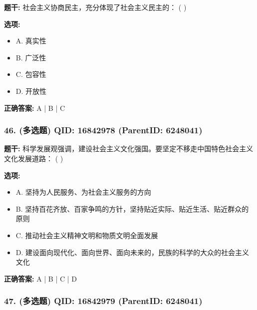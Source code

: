 \documentclass[12pt,UTF8]{ctexart}
\begin{document}
\textbf{题干:}
社会主义协商民主，充分体现了社会主义民主的： ( )



\textbf{选项:}
\begin{itemize}[leftmargin=*]

  \item A. 真实性

  \item B. 广泛性

  \item C. 包容性

  \item D. 开放性

\end{itemize}

\textbf{正确答案:}
A | B | C

\vspace{0.3em}\hrulefill\vspace{0.7em}

\subsubsection*{46. (多选题) \small QID: 16842978 (ParentID: 6248041)}

\textbf{题干:}
科学发展观强调，建设社会主义文化强国。要坚定不移走中国特色社会主义文化发展道路： ( )



\textbf{选项:}
\begin{itemize}[leftmargin=*]

  \item A. 坚持为人民服务、为社会主义服务的方向

  \item B. 坚持百花齐放、百家争鸣的方针，坚持贴近实际、贴近生活、贴近群众的原则

  \item C. 推动社会主义精神文明和物质文明全面发展

  \item D. 建设面向现代化、面向世界、面向未来的，民族的科学的大众的社会主义文化

\end{itemize}

\textbf{正确答案:}
A | B | C | D

\vspace{0.3em}\hrulefill\vspace{0.7em}

\subsubsection*{47. (多选题) \small QID: 16842979 (ParentID: 6248041)}
\end{document}
